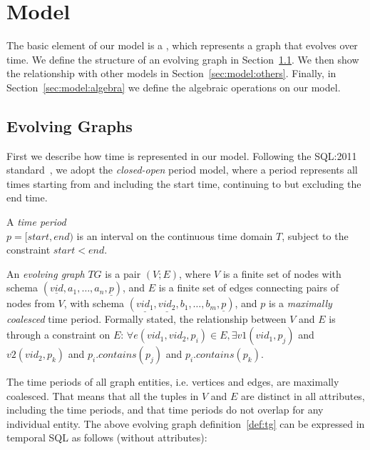 \section{Model}
\label{sec:model}

The basic element of our model is a \tg, which represents a graph that
evolves over time.  We define the structure of an evolving graph in
Section~\ref{sec:model:structure}.  We then show the relationship with
other models in Section~\ref{sec:model:others}.  Finally, in
Section~\ref{sec:model:algebra} we define the algebraic operations on
our model.

\subsection{Evolving Graphs}
\label{sec:model:structure}

First we describe how time is represented in our model.  Following the
SQL:2011 standard~\cite{DBLP:journals/sigmod/KulkarniM12}, we adopt
the {\em closed-open} period model, where a period represents all
times starting from and including the start time, continuing to but
excluding the end time.

\begin{definition}
A {\em time period} \\$p = [start, end)$ is an interval on the
  continuous time domain $T$, subject to the constraint $start < end$.
\label{def:period} 
\end{definition}

\begin{definition}[TGraph]
An {\em evolving graph} $TG$ is a pair $(V;E)$, where $V$ is a finite
set of nodes with schema $(\underline{vid}, a_1, \ldots, a_n,
\underline{p})$, and $E$ is a finite set of edges connecting pairs of
nodes from $V$, with schema $(\underline{vid_1}, \underline{vid_2},
b_1, \ldots, b_m, \underline{p})$, and $p$ is a {\em maximally
  coalesced} time period.  Formally stated, the relationship between
$V$ and $E$ is through a constraint on $E$: $\forall e(vid_1, vid_2,
p_i) \in E, \exists v1(vid_1, p_j)$ and $v2(vid_2, p_k)$ and
$p_i.contains(p_j)$ and $p_i.contains(p_k)$.
\label{def:tg}
\end{definition}

The time periods of all graph entities, i.e. vertices and edges, are
maximally coalesced.  That means that all the tuples in $V$ and $E$
are distinct in all attributes, including the time periods, and that
time periods do not overlap for any individual entity.  The above
evolving graph definition~\ref{def:tg} can be expressed in temporal
SQL as follows (without attributes):

